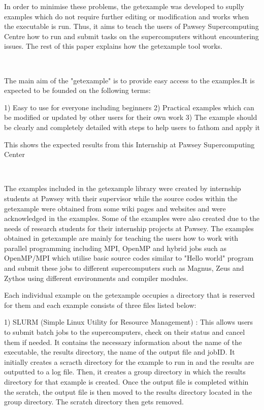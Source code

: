 \begin{Document}
{\begin{Introduction}
In order to minimise these problems, the getexample was developed to suplly examples which do not require further editing or modification and works
when the executable is run. Thus, it aims to teach the users of Pawsey Supercomputing Centre how to run and submit tasks on the supercomputers without 
encountering issues. The rest of this paper explains how the getexample tool works.   


\end{Introduction}
\
\

The main aim of the "getexample" is to provide easy access to the examples.It is expected to be founded on the following terms:

1) Easy to use for everyone including beginners
2) Practical examples which can be modified or updated by other users for their own work
3) The example should be clearly and completely detailed with steps to help users to fathom and apply it

\Section{Scope}
\begin{scope}

This shows the expected results from this Internship at Pawsey Supercomputing Center
\
\



\end{scope}
\

The examples included in the getexample library were created by internship students at Pawsey with their supervisor while the source codes within the
getexample were obtained from some wiki pages and websites and were acknowledged in the examples. Some of the examples were also created due to the
needs of research students for their internship projects at Pawsey. The examples obtained in getexample are mainly for teaching the users how to work
with parallel programming including MPI, OpenMP and hybrid jobs such as OpenMP/MPI which utilise basic source codes similar to "Hello world" program and
submit these jobs to different supercomputers such as Magnus, Zeus and Zythos using different environments and compiler modules. 

Each individual example on the getexample occupies a directory that is reserved for them and each example consists of three files listed below:
    
1) SLURM (Simple Linux Utility for Resource Management) : This allows users to submit batch jobs to the supercomputers, check on their status and cancel 
them if needed. It contains the necessary information about the name of the executable, the results directory, the name of the output file and jobID. It 
initially creates a scracth directory for the example to run in and the results are outputted to a log file. Then, it creates a group directory in which
the results directory for that example is created. Once the output file is completed within the scratch, the output file is then moved to the results
directory located in the group directory. The scratch directory then gets removed.

}
\end{Document}

